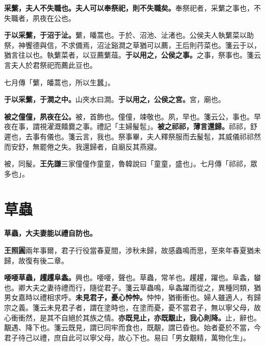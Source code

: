 
\textbf{采蘩，夫人不失職也。夫人可以奉祭祀，則不失職矣。}{\footnotesize 奉祭祀者，采蘩之事也，不失職者，夙夜在公也。}

\textbf{于以采蘩，于沼于沚。}{\footnotesize 蘩，皤蒿也。于於、沼池、沚渚也。公侯夫人執蘩菜以助祭，神饗德與信，不求備焉，沼沚谿澗之草猶可以薦，王后則荇菜也。箋云于以，猶言往以也。執蘩菜者，以豆薦蘩葅。}\textbf{于以用之，公侯之事。}{\footnotesize 之事，祭事也。箋云言夫人於君祭祀而薦此豆也。}

\begin{quoting}七月傳「蘩，皤蒿也，所以生蠶」。\end{quoting}

\textbf{于以采蘩，于澗之中。}{\footnotesize 山夾水曰澗。}\textbf{于以用之，公侯之宮。}{\footnotesize 宮，廟也。}

\textbf{被之僮僮，夙夜在公。}{\footnotesize 被，首飾也。僮僮，竦敬也。夙，早也。箋云公，事也。早夜在事，謂視濯溉饎爨之事。禮記「主婦髲髢」。}\textbf{被之祁祁，薄言還歸。}{\footnotesize 祁祁，舒遲也，去事有儀也。箋云言，我也。祭事畢，夫人釋祭服而去髲髢，其威儀祁祁然而安舒，無罷倦之失。我還歸者，自廟反其燕寢。}

\begin{quoting}被，同髲。\textbf{王先謙}三家僮僮作童童，魯韓說曰「童童，盛也」。七月傳「祁祁，眾多也」。\end{quoting}

\section{草蟲}


\textbf{草蟲，大夫妻能以禮自防也。}

\begin{quoting}\textbf{王照圓}兩年事爾，君子行役當春夏間，涉秋未歸，故感蟲鳴而思，至來年春夏猶未歸，故復有後二章。\end{quoting}

\textbf{喓喓草蟲，趯趯阜螽。}{\footnotesize 興也。喓喓，聲也。草蟲，常羊也。趯趯，躍也。阜螽，蠜也。卿大夫之妻待禮而行，隨從君子。箋云草蟲鳴，阜螽躍而從之，異種同類，猶男女嘉時以禮相求呼。}\textbf{未見君子，憂心忡忡。}{\footnotesize 忡忡，猶衝衝也。婦人雖適人，有歸宗之義。箋云未見君子者，謂在塗時也，在塗而憂，憂不當君子，無以寧父母，故心衝衝然，是其不自絕於其族之情。}\textbf{亦既見止，亦既覯止，我心則降。}{\footnotesize 止，辭也。覯遇、降下也。箋云既見，謂已同牢而食也，既覯，謂已昏也。始者憂於不當，今君子待己以禮，庶自此可以寧父母，故心下也。易曰「男女覯精，萬物化生」。}

